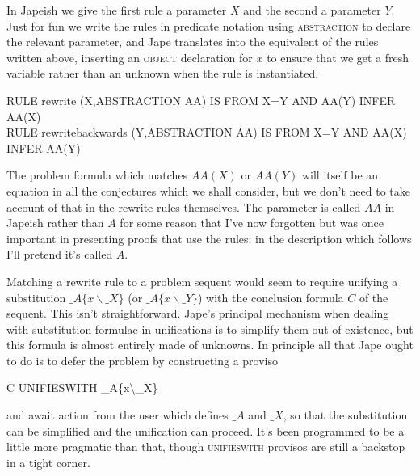 In Japeish we give the first rule a parameter $X$ and the second a parameter $Y$. Just for fun we write the rules in predicate notation using \textsc{abstraction} to declare the relevant parameter, and Jape translates into the equivalent of the rules written above, inserting an \textsc{object} declaration for $x$ to ensure that we get a fresh variable rather than an unknown when the rule is instantiated.
\begin{japeish}
RULE   rewrite (X,ABSTRACTION AA)           IS FROM X=Y AND AA(Y) INFER AA(X)\\
RULE   rewritebackwards (Y,ABSTRACTION AA)  IS FROM X=Y AND AA(X) INFER AA(Y)
\end{japeish}
The problem formula which matches $AA(X)$ or $AA(Y)$ will itself be an equation in all the conjectures which we shall consider, but we don't need to take account of that in the rewrite rules themselves. The parameter is called $AA$ in Japeish rather than $A$ for some reason that I've now forgotten but was once important in presenting proofs that use the rules: in the description which follows I'll pretend it's called $A$.

Matching a rewrite rule to a problem sequent would seem to require unifying a substitution $\_A\{x\backslash \_X\}$ (or $\_A\{x\backslash \_Y\}$) with the conclusion formula $C$ of the sequent. This isn't straightforward. Jape's principal mechanism when dealing with substitution formulae in unifications is to simplify them out of existence, but this formula is almost entirely made of unknowns. In principle all that Jape ought to do is to defer the problem by constructing a proviso
\begin{japeish}
C UNIFIESWITH \_A\{x\textbackslash\_X\}
\end{japeish}
and await action from the user which defines $\_A$ and $\_X$, so that the substitution can be simplified and the unification can proceed. It's been programmed to be a little more pragmatic than that, though \textsc{unifieswith} provisos are still a backstop in a tight corner.
 

